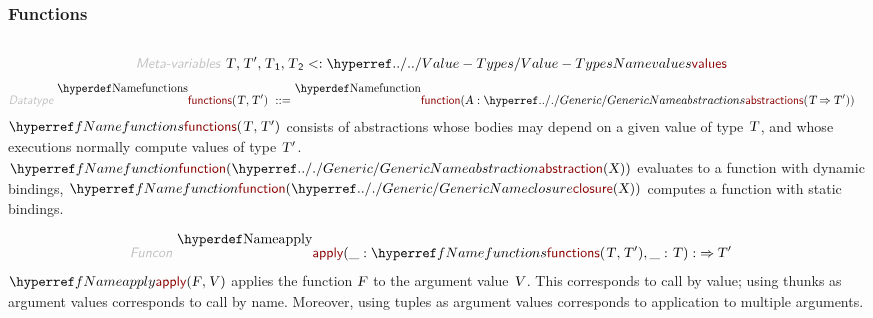 \subsubsection*{Functions}\hypertarget{functions}{}\label{functions}

\begin{align*}
  [ ~ 
  \KEY{Datatype} ~ & \NAMEREF{functions} \\
  \KEY{Funcon} ~ & \NAMEREF{function} \\
  \KEY{Funcon} ~ & \NAMEREF{apply} \\
  \KEY{Funcon} ~ & \NAMEREF{supply} \\
  \KEY{Funcon} ~ & \NAMEREF{compose} \\
  \KEY{Funcon} ~ & \NAMEREF{uncurry} \\
  \KEY{Funcon} ~ & \NAMEREF{curry} \\
  \KEY{Funcon} ~ & \NAMEREF{partial-apply}
  ~ ]
\end{align*}
\begin{align*}
  \KEY{Meta-variables} ~ 
  & \VAR{T}, \VAR{T}', \VAR{T}\SUB{1}, \VAR{T}\SUB{2} <: \NAMEHYPER{../..}{Value-Types}{values}
\end{align*}
\begin{align*}
  \KEY{Datatype} ~ 
  \NAMEDECL{functions}(\VAR{T} , \VAR{T}' )  
  ~ ::= ~ & \NAMEDECL{function} (\VAR{A} : \NAMEHYPER{../.}{Generic}{abstractions}
                                         ( \VAR{T} \TO \VAR{T}' ))
\end{align*}
$\SHADE{\NAMEREF{functions}
           ( \VAR{T},   
             \VAR{T}' )}$ consists of abstractions whose bodies may depend on
  a given value of type $\SHADE{\VAR{T}}$, and whose executions normally compute values 
  of type $\SHADE{\VAR{T}'}$.
  $\SHADE{\NAMEREF{function}
           ( \NAMEHYPER{../.}{Generic}{abstraction}
               ( \VAR{X} ) )}$ evaluates to a function with dynamic bindings,
  $\SHADE{\NAMEREF{function}
           ( \NAMEHYPER{../.}{Generic}{closure}
               ( \VAR{X} ) )}$ computes a function with static bindings.

\begin{align*}
  \KEY{Funcon} ~ 
  & \NAMEDECL{apply}(\_ : \NAMEREF{functions}
                                ( \VAR{T},   
                                  \VAR{T}' ), \_ : \VAR{T}) :  \TO \VAR{T}'
\end{align*}
$\SHADE{\NAMEREF{apply}
           ( \VAR{F},   
             \VAR{V} )}$ applies the function $\SHADE{\VAR{F}}$ to the argument value $\SHADE{\VAR{V}}$.
  This corresponds to call by value; using thunks as argument values
  corresponds to call by name. Moreover, using tuples as argument values 
  corresponds to application to multiple arguments.

